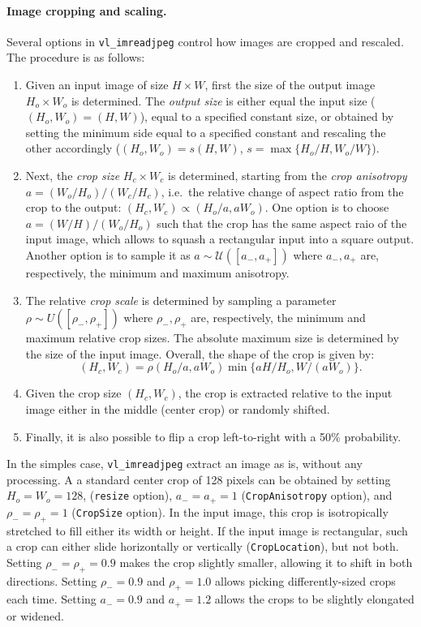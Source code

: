 \paragraph{Image cropping and scaling.} Several options in \verb!vl_imreadjpeg! control how images are cropped and rescaled. The procedure is as follows:
\begin{enumerate}
	\item Given an input image of size $H \times W$, first the size of the output image $H_o \times W_o$ is determined. The \emph{output size} is either equal the input size ($(H_o,W_o) = (H,W)$), equal to a specified constant size, or obtained by setting the minimum side equal to a specified constant and rescaling the other accordingly ($(H_o,W_o) = s(H,W)$, $s = \max\{H_o/H,W_o/W\}$).
	\item Next, the \emph{crop size} $H_c \times W_c$ is determined, starting from the \emph{crop anisotropy} $a = (W_o/H_o)/(W_c/H_c)$, i.e.\ the relative change of aspect ratio from the crop to the output: $(H_c,W_c)\propto (H_o/a,aW_o)$. One option is to choose $a=(W/H)/(W_o/H_o)$ such that the crop has the same aspect raio of the input image, which allows to squash a rectangular input into a square output. Another option is to sample it as $a\sim\mathcal{U}([a_-,a_+])$ where $a_-,a_+$ are, respectively, the minimum and maximum anisotropy.	
	\item The relative \emph{crop scale} is determined by sampling a parameter $\rho \sim U([\rho_-, \rho_+])$ where $\rho_-,\rho_+$ are, respectively, the minimum and maximum relative crop sizes. The absolute maximum size is determined by the size of the input image. Overall, the shape of the crop is given by:
	\[
	(H_c,W_c) = \rho(H_o/a,a W_o) \min\{ a H / H_o, W/(aW_o)\}.
	\]
	\item Given the crop size $(H_c,W_c)$, the crop is extracted relative to the input image either in the middle (center crop) or randomly shifted.
	\item Finally, it is also possible to flip a crop left-to-right with a 50\% probability.
\end{enumerate}
In the simples case, \verb!vl_imreadjpeg! extract an image as is, without any processing. A a standard center crop of 128 pixels can be obtained by setting $H_o=W_o=128$, (\verb!resize! option), $a_-=a_+=1$ (\verb!CropAnisotropy! option), and $\rho_-=\rho_+=1$ (\verb!CropSize! option). In the input image, this crop is isotropically stretched to fill either its width or height. If the input image is rectangular, such a crop can either slide horizontally or vertically (\verb!CropLocation!), but not both. Setting $\rho_- = \rho_+ = 0.9$ makes the crop slightly smaller, allowing it to shift in both directions. Setting $\rho_- = 0.9$ and $\rho_+ = 1.0$ allows picking differently-sized crops each time. Setting $a_-=0.9$ and $a_+=1.2$ allows the crops to be slightly elongated or widened.

